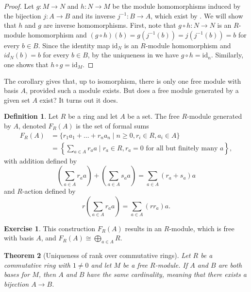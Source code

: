 \documentclass[12pt]{report}
\newtheorem{theorem}{Theorem}[chapter]
\numberwithin{equation}{section}
\numberwithin{theorem}{chapter}
\theoremstyle{definition}
\newtheorem{definition}[theorem]{Definition}
\newtheorem{exercise}{Exercise}
\newtheorem*{basic properties}{Basic Properties}
\newtheorem*{Important Remark}{Important Remark}
\begin{document}
\begin{proof}
Let $g:M\to N$ and $h:N\to M$ be the module homomorphisms induced by the bijection $j:A\to B$ and its inverse $j^{-1}:B\to A$, which exist by . We will show that $h$ and $g$ are inverse homomorphisms. 
First, note that $g \circ h:N\to N$ is an $R$-module homomorphism and $(g \circ h)(b) = g(j^{-1}(b))=j(j^{-1}(b))=b$ for every $b\in B$. Since the identity map $\mathrm{id}_N$ is an $R$-module homomorphism and $id_N(b)=b$ for every $b\in B$, by the uniqueness in  we have $g \circ h = \mathrm{id}_n$. Similarly, one shows that $h \circ g = \mathrm{id}_M$.
\end{proof}



The corollary gives that, up to isomorphism, there is only one free module with basis $A$, provided such a module exists. But does a free module generated by a given set $A$ exist? It turns out it does.  

\begin{definition}
Let $R$ be a ring and let $A$ be a set. The free $R$-module generated by $A$, denoted $F_R(A)$ is the set of formal sums 
\begin{align*}
F_R(A) &= \{r_1a_1 + \dots + r_na_n \mid n \geqslant 0, r_i \in R, a_i \in A\} \\
&= \left\lbrace \sum_{a \in A} r_aa \mid r_a \in R, r_a = 0 \text{ for all but finitely many }a \right\rbrace,
\end{align*} with addition defined by 
$$\left(\sum_{a \in A} r_aa\right) + \left(\sum_{a \in A} s_aa \right) = \sum_{a \in A} (r_a + s_a)a$$ and $R$-action defined by 
$$r \left(\sum_{a \in A} r_aa \right) = \sum_{a \in A} (rr_a)a.$$  
\end{definition}

\begin{exercise}
This construction $F_R(A)$ results in an $R$-module, which is free with basis $A$, and $F_R(A)\cong \bigoplus_{a\in A}R$.
\end{exercise}




\begin{theorem}[Uniqueness of rank over commutative rings]\label{thm:rank}
Let $R$ be a commutative ring with $1 \neq 0$ and let $M$ be a free $R$-module. If $A$ and $B$ are both bases for $M$, then $A$ and $B$ have the same cardinality, meaning that there exists a bijection $A \to B$.
\end{theorem}
\end{document}
